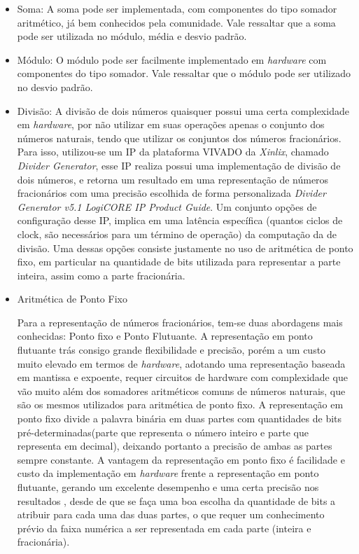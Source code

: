 \begin{itemize}
	\item 

{Soma:} A soma pode ser implementada, com componentes do tipo somador aritmético, já bem conhecidos pela comunidade. Vale ressaltar que a soma pode ser utilizada no módulo, média e desvio padrão.
\item {Módulo:} O módulo pode ser facilmente implementado em \textit{hardware} com componentes do tipo somador. Vale ressaltar que o módulo pode ser utilizado no desvio padrão.
\item {Divisão:} A divisão de dois números quaisquer possui uma certa complexidade em \textit{hardware}, por não utilizar em suas operações apenas o conjunto dos números naturais, tendo que utilizar os conjuntos dos números fracionários. Para isso, utilizou-se um IP da plataforma VIVADO da \textit{Xinlix}, chamado \textit{Divider Generator}, esse IP realiza possui uma implementação de divisão de dois números, e retorna um resultado em uma representação de números fracionários com uma precisão escolhida de forma personalizada \textit{Divider Generator v5.1 LogiCORE IP Product Guide}. Um conjunto opções de configuração desse IP, implica em uma latência específica (quantos ciclos de clock, são necessários para um término de operação) da computação da de divisão. Uma dessas opções consiste justamente no uso de aritmética de ponto fixo, em particular na quantidade de bits utilizada para representar a parte inteira, assim como a parte fracionária.

\item {Aritmética de Ponto Fixo} 	

Para a representação de números fracionários, tem-se duas abordagens mais conhecidas: Ponto fixo e Ponto Flutuante. A representação em ponto flutuante trás consigo grande flexibilidade e precisão, porém a um custo muito elevado em termos de \textit{hardware}, adotando uma representação baseada em mantissa e expoente, requer circuitos de hardware com complexidade que vão muito além dos somadores aritméticos comuns de números naturais, que são os mesmos utilizados para aritmética de ponto fixo. A representação em ponto fixo divide a palavra binária em duas partes com quantidades de bits pré-determinadas(parte que representa o número inteiro e parte que representa em decimal), deixando portanto a precisão de ambas as partes sempre constante. A vantagem da representação em ponto fixo é facilidade e custo da implementação em \textit{hardware} frente a representação em ponto flutuante, gerando um excelente desempenho e uma certa precisão nos resultados \cite{woods2008reconfigurable}, desde de que se faça uma boa escolha da quantidade de bits a atribuir para cada uma das duas partes, o que requer um conhecimento prévio da faixa numérica a ser representada em cada parte (inteira e fracionária).


\end{itemize}
